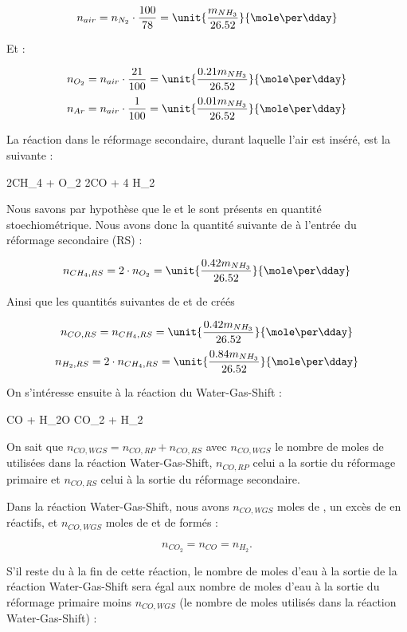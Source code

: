 $$n_{air}= n_{N_2} \cdot \frac{100}{78} = \unit{\frac{m_{NH_3}}{26.52}}{\mole\per\dday}$$ 

Et :

$$n_{O_2}= n_{air} \cdot \frac{21}{100} = \unit{\frac{0.21m_{NH_3}}{26.52}}{\mole\per\dday}$$
$$n_{Ar}= n_{air} \cdot \frac{1}{100} = \unit{\frac{0.01m_{NH_3}}{26.52}}{\mole\per\dday}$$

La réaction dans le réformage secondaire, durant laquelle l'air est inséré, est la suivante :
\begin{chemmath}
	2CH_4 + O_2 \Longrightarrow 2CO + 4 H_2
\end{chemmath}  

Nous savons par hypothèse que le
 et le  sont présents en quantité stoechiométrique. 
Nous avons donc la quantité suivante de  à l'entrée du réformage secondaire (RS) : 

$$n_{CH_4,RS} = 2 \cdot n_{O_2} = \unit{\frac{0.42m_{NH_3}}{26.52}}{\mole\per\dday}$$

Ainsi que les quantités suivantes de  et de  créés 

$$n_{CO,RS} = n_{CH_4,RS} =  \unit{\frac{0.42m_{NH_3}}{26.52}} {\mole\per\dday}$$
$$n_{H_2,RS} = 2 \cdot n_{CH_4,RS} =  \unit{\frac{0.84m_{NH_3}}{26.52}}{\mole\per\dday}$$

On s'intéresse ensuite à la réaction du Water-Gas-Shift : 

\begin{chemmath}
	CO + H_2O \Longrightarrow CO_2 + H_2
\end{chemmath} 

On sait que $n_{CO,WGS} = n_{CO,RP} + n_{CO,RS}$ avec $n_{CO,WGS}$ 
le nombre de moles de  utilisées dans la réaction Water-Gas-Shift,
$n_{CO,RP}$ celui a la sortie du réformage primaire et $n_{CO,RS}$ celui 
à la sortie du réformage secondaire.

Dans la réaction Water-Gas-Shift, nous avons $n_{CO,WGS}$ moles de ,
un excès de  en réactifs, et $n_{CO,WGS}$ moles de  et de 
 formés :

$$n_{CO_2} = n_{CO} = n_{H_2}.$$

S'il reste du  à la fin de cette réaction, le nombre de moles d'eau
à la sortie de la réaction Water-Gas-Shift sera égal aux nombre de moles d'eau à la
sortie du réformage primaire moins $n_{CO,WGS}$ (le nombre de moles utilisés dans 
la réaction Water-Gas-Shift) :

